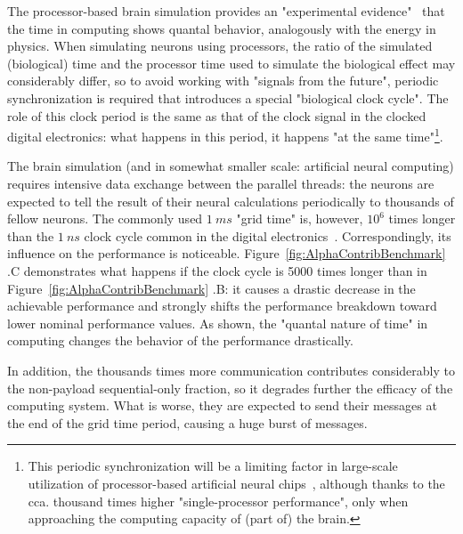 {
	
	The processor-based brain simulation provides an
	"experimental evidence"~\cite{VeghBrainAmdahl:2019} that the time in computing shows quantal behavior, analogously with the energy in physics. When simulating neurons using processors,
	the ratio of the simulated (biological) time and the processor time used to simulate the biological effect may considerably differ, so to avoid working with "signals from the future", periodic synchronization is required that introduces a special "biological clock cycle".
	The role of this clock period is the same as that of the clock signal in the clocked digital electronics: what happens in this period, it happens "at the same time"\footnote{This periodic synchronization will be a limiting factor in large-scale utilization of processor-based artificial neural chips~\cite{IntelLoihi:2018}, although thanks to the cca. thousand times higher "single-processor performance", only when approaching the computing capacity of (part of) the brain.}.
	
	The brain simulation (and in somewhat smaller scale: artificial neural computing) requires intensive data exchange between the parallel threads:
	the neurons are expected to tell the result of their neural calculations periodically to thousands of fellow neurons.
	The commonly used $1~ms$ "grid time" is,
	however, $10^6$ times longer than the
	$1~ns$ clock cycle common in the digital electronics~\cite{NeuralNetworkPerformance:2018}.
	Correspondingly, its influence on the performance is noticeable.
	Figure~\ref{fig:AlphaContribBenchmark}
	.C demonstrates what happens if the clock cycle is 5000 times longer than in Figure~\ref{fig:AlphaContribBenchmark}
	.B:
	it causes a drastic decrease in the achievable performance and strongly shifts the performance breakdown toward lower nominal performance values.
	As shown, the "quantal nature of time" in computing
	changes the behavior of the performance drastically.
	
	
	
	In addition, the thousands times more communication contributes considerably to the non-payload sequential-only fraction,
	so it degrades further the efficacy of the computing system.  What is worse, they are expected to send their messages at the end of the grid time period, causing a huge burst of messages.
}


